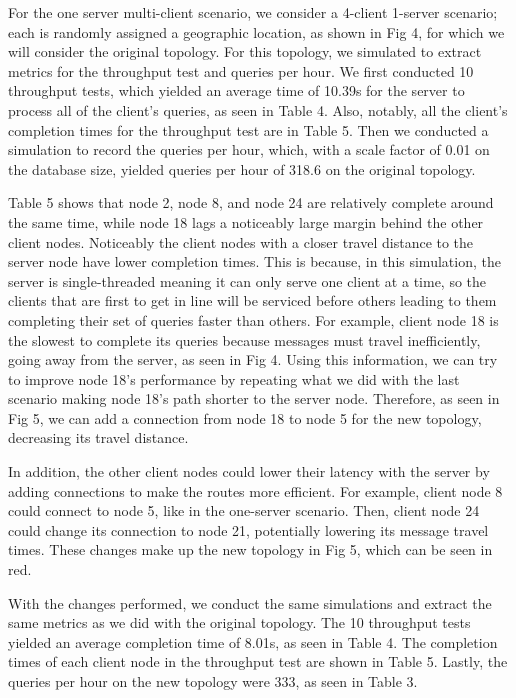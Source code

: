 For the one server multi-client scenario, we consider a 4-client 1-server scenario; each is randomly assigned a geographic location, as shown in Fig 4, for which we will consider the original topology. For this topology, we simulated to extract metrics for the throughput test and queries per hour. We first conducted 10 throughput tests, which yielded an average time of 10.39s for the server to process all of the client's queries, as seen in Table 4.  Also, notably, all the client's completion times for the throughput test are in Table 5. Then we conducted a simulation to record the queries per hour, which, with a scale factor of 0.01 on the database size, yielded queries per hour of 318.6 on the original topology.
	
	Table 5 shows that node 2, node 8, and node 24 are relatively complete around the same time, while node 18 lags a noticeably large margin behind the other client nodes. Noticeably the client nodes with a closer travel distance to the server node have lower completion times. This is because, in this simulation, the server is single-threaded meaning it can only serve one client at a time, so the clients that are first to get in line will be serviced before others leading to them completing their set of queries faster than others. For example, client node 18 is the slowest to complete its queries because messages must travel inefficiently, going away from the server, as seen in Fig 4. Using this information, we can try to improve node 18’s performance by repeating what we did with the last scenario making node 18’s path shorter to the server node. Therefore, as seen in Fig 5, we can add a connection from node 18 to node 5 for the new topology, decreasing its travel distance.

	In addition, the other client nodes could lower their latency with the server by adding connections to make the routes more efficient. For example, client node 8 could connect to node 5, like in the one-server scenario. Then, client node 24 could change its connection to node 21, potentially lowering its message travel times. These changes make up the new topology in Fig 5, which can be seen in red.

	With the changes performed, we conduct the same simulations and extract the same metrics as we did with the original topology. The 10 throughput tests yielded an average completion time of 8.01s, as seen in Table 4. The completion times of each client node in the throughput test are shown in Table 5. Lastly, the queries per hour on the new topology were 333, as seen in Table 3.

